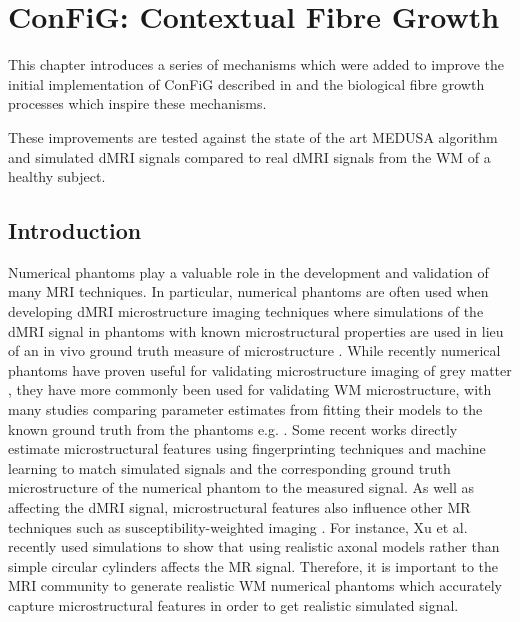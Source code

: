 \chapter{ConFiG: Contextual Fibre Growth}
\label{chap:config}

\chaptertoc{}

\begin{chapterabstract}
  This chapter introduces a series of mechanisms which were added to improve the initial implementation of \ac{ConFiG} described in  and the biological fibre growth processes which inspire these mechanisms.

  These improvements are tested against the state of the art MEDUSA algorithm and simulated \ac{dMRI} signals compared to real \ac{dMRI} signals from the \acl{WM} of a healthy subject.
\end{chapterabstract}

\section{Introduction}
\label{sec:config_introduction}
Numerical phantoms play a valuable role in the development and validation of many \ac{MRI} techniques.
In particular, numerical phantoms are often used when developing \ac{dMRI} microstructure imaging techniques where simulations of the \ac{dMRI} signal in phantoms with known microstructural properties are used in lieu of an in vivo ground truth measure of microstructure \cite{Alexander2017}.
While recently numerical phantoms have proven useful for validating microstructure imaging of grey matter \cite{Palombo2020}, they have more commonly been used for validating \ac{WM} microstructure, with many studies comparing parameter estimates from fitting their models to the known ground truth from the phantoms e.g. \cite{Li2019,Jelescu2017,Scherrer2016,Tariq2016,Daducci2015,Nilsson2017,Xu2014,Zhang2012,Nilsson2010}.
Some recent works directly estimate microstructural features using fingerprinting techniques and machine learning to match simulated signals and the corresponding ground truth microstructure of the numerical phantom to the measured signal\cite{Hill2019,Palombo2018a,Rensonnet2018,Nedjati-Gilani2017}.
As well as affecting the \ac{dMRI} signal, microstructural features also influence other MR techniques such as susceptibility-weighted imaging \cite{Li2012,Lee2010}.
For instance, Xu et al. \cite{Xu2018} recently used simulations to show that using realistic axonal models rather than simple circular cylinders affects the MR signal.
Therefore, it is important to the \ac{MRI} community to generate realistic \ac{WM} numerical phantoms which accurately capture microstructural features in order to get realistic simulated signal.

